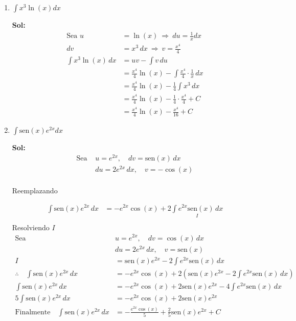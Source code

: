 \documentclass[letterpaper,12pt]{article}
\theoremstyle{plain}
\theoremstyle{definition}
\newcommand{\sen}{\text{sen}}
\begin{document}
\begin{enumerate}
\begin{enumerate}
\begin{enumerate}
\color{black}

    
    \item $\displaystyle \int x^3 \ln(x) dx$

\color{blue}
\textbf{Sol:} $$
\begin{aligned}
\text{Sea } u &= \ln(x) \ \Rightarrow \ du = \frac{1}{x} dx \\
dv &= x^3\,dx \ \Rightarrow \ v = \frac{x^4}{4} \\[6pt]
\int x^3 \ln(x)\,dx 
&= uv - \int v\,du \\
&= \frac{x^4}{4} \ln(x) - \int \frac{x^4}{4} \cdot \frac{1}{x}\,dx \\
&= \frac{x^4}{4} \ln(x) - \frac{1}{4} \int x^3\,dx \\
&= \frac{x^4}{4} \ln(x) - \frac{1}{4} \cdot \frac{x^4}{4} + C \\
&= \frac{x^4}{4} \ln(x) - \frac{x^4}{16} + C
\end{aligned}
$$
\color{black}

    
    \item $\displaystyle \int \sen(x) e^{2x} dx$

\color{blue}
\textbf{Sol:}  
\begin{align*}
\text{Sea } & u = e^{2x}, \quad dv = \sen(x) \, dx \\
& du = 2 e^{2x} \, dx, \quad v = -\cos(x) \\
\end{align*}

\vspace{-1cm}
Reemplazando
\vspace{-0.5cm}

\begin{align*}
\int \sen(x) e^{2x} \, dx &= - e^{2x} \cos(x) + 2 \underset{I}{\int e^{2x} \sen(x) \, dx} \\
\end{align*}
\vspace{-1cm}
Resolviendo $I$
\vspace{-0.5cm}
\begin{align*}
\text{Sea} \ & u = e^{2x}, \quad dv = \cos(x) \, dx \\
& du = 2 e^{2x} \, dx, \quad v = \sen(x) \\
 I &= \sen(x) e^{2x} - 2 \int e^{2x} \sen(x) \, dx \\
\therefore \quad \int \sen(x) e^{2x} \, dx &= - e^{2x} \cos(x) + 2 \left( \sen(x) e^{2x} -2 \int e^{2x} \sen(x) \, dx\right) \\
\int \sen(x) e^{2x} \, dx &= - e^{2x} \cos(x) + 2 \sen(x) e^{2x} -4 \int e^{2x} \sen(x) \, dx \\
5\int \sen(x) e^{2x} \, dx &= - e^{2x} \cos(x) + 2 \sen(x) e^{2x} \\
\text{Finalmente} \quad \int \sen(x) e^{2x} \, dx &= - \frac{e^{2x} \cos(x)}{5} + \frac{2}{5} \sen(x) e^{2x} + C
\end{align*}
\color{black}



\end{enumerate}
\end{enumerate}
\end{enumerate}
\end{document}
